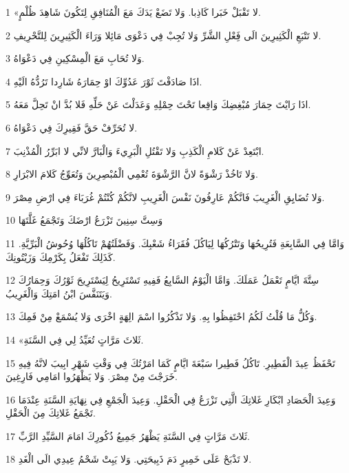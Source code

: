 \par 1 «لا تَقْبَلْ خَبَرا كَاذِبا. وَلا تَضَعْ يَدَكَ مَعَ الْمُنَافِقِ لِتَكُونَ شَاهِدَ ظُلْمٍ.
\par 2 لا تَتْبَعِ الْكَثِيرِينَ الَى فَِعْلِ الشَّرِّ وَلا تُجِبْ فِي دَعْوَى مَائِلا وَرَاءَ الْكَثِيرِينَ لِلتَّحْرِيفِ.
\par 3 وَلا تُحَابِ مَعَ الْمِسْكِينِ فِي دَعْوَاهُ.
\par 4 اذَا صَادَفْتَ ثَوْرَ عَدُوِّكَ اوْ حِمَارَهُ شَارِدا تَرُدُّهُ الَيْهِ.
\par 5 اذَا رَايْتَ حِمَارَ مُبْغِضِكَ وَاقِعا تَحْتَ حِمْلِهِ وَعَدَلْتَ عَنْ حَلِّهِ فَلا بُدَّ انْ تَحِلَّ مَعَهُ.
\par 6 لا تُحَرِّفْ حَقَّ فَقِيرِكَ فِي دَعْوَاهُ.
\par 7 ابْتَعِدْ عَنْ كَلامِ الْكَذِبِ وَلا تَقْتُلِ الْبَرِيءَ وَالْبَارَّ لانِّي لا ابَرِّرُ الْمُذْنِبَ.
\par 8 وَلا تَاخُذْ رَشْوَةً لانَّ الرَّشْوَةَ تُعْمِي الْمُبْصِرِينَ وَتُعَوِّجُ كَلامَ الابْرَارِ.
\par 9 وَلا تُضَايِقِ الْغَرِيبَ فَانَّكُمْ عَارِفُونَ نَفْسَ الْغَرِيبِ لانَّكُمْ كُنْتُمْ غُرَبَاءَ فِي ارْضِ مِصْرَ.
\par 10 وَسِتَّ سِنِينَ تَزْرَعُ ارْضَكَ وَتَجْمَعُ غَلَّتَهَا
\par 11 وَامَّا فِي السَّابِعَةِ فَتُرِيحُهَا وَتَتْرُكُهَا لِيَاكُلَ فُقَرَاءُ شَعْبِكَ. وَفَضْلَتُهُمْ تَاكُلُهَا وُحُوشُ الْبَرِّيَّةِ. كَذَلِكَ تَفْعَلُ بِكَرْمِكَ وَزَيْتُونِكَ.
\par 12 سِتَّةَ ايَّامٍ تَعْمَلُ عَمَلَكَ. وَامَّا الْيَوْمُ السَّابِعُ فَفِيهِ تَسْتَرِيحُ لِيَسْتَرِيحَ ثَوْرُكَ وَحِمَارُكَ وَيَتَنَفَّسَ ابْنُ امَتِكَ وَالْغَرِيبُ.
\par 13 وَكُلُّ مَا قُلْتُ لَكُمُ احْتَفِظُوا بِهِ. وَلا تَذْكُرُوا اسْمَ الِهَةٍ اخْرَى وَلا يُسْمَعْ مِنْ فَمِكَ.
\par 14 «ثَلاثَ مَرَّاتٍ تُعَيِّدُ لِي فِي السَّنَةِ.
\par 15 تَحْفَظُ عِيدَ الْفَطِيرِ. تَاكُلُ فَطِيرا سَبْعَةَ ايَّامٍ كَمَا امَرْتُكَ فِي وَقْتِ شَهْرِ ابِيبَ لانَّهُ فِيهِ خَرَجْتَ مِنْ مِصْرَ. وَلا يَظْهَرُوا امَامِي فَارِغِينَ.
\par 16 وَعِيدَ الْحَصَادِ ابْكَارِ غَلاتِكَ الَّتِي تَزْرَعُ فِي الْحَقْلِ. وَعِيدَ الْجَمْعِ فِي نِهَايَةِ السَّنَةِ عِنْدَمَا تَجْمَعُ غَلاتِكَ مِنَ الْحَقْلِ.
\par 17 ثَلاثَ مَرَّاتٍ فِي السَّنَةِ يَظْهَرُ جَمِيعُ ذُكُورِكَ امَامَ السَّيِّدِ الرَّبِّ.
\par 18 لا تَذْبَحْ عَلَى خَمِيرٍ دَمَ ذَبِيحَتِي. وَلا يَبِتْ شَحْمُ عِيدِي الَى الْغَدِ.
